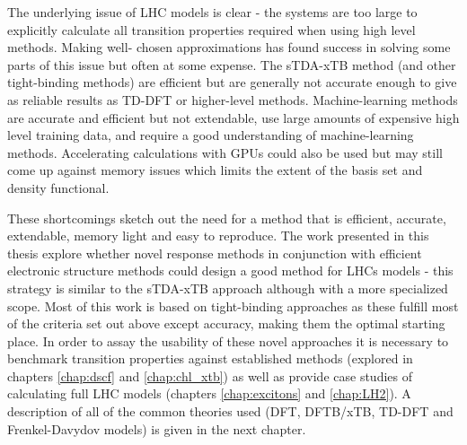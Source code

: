 The underlying issue of LHC models is clear - the systems are too large to explicitly
calculate all transition properties required when using high level methods. Making
well- chosen approximations has found success in solving some parts of this issue
but often at some expense. The sTDA-xTB method (and other tight-binding methods) 
are efficient but are generally not accurate enough to give as reliable results 
as TD-DFT or higher-level methods. Machine-learning methods are accurate and efficient
but not extendable, use large amounts of expensive high level training data, and
require a good understanding of machine-learning methods. Accelerating calculations 
with GPUs could also be used but may still come up against memory issues which limits 
the extent of the basis set and density functional.

These shortcomings sketch out the need for a method that is efficient, accurate,
extendable, memory light and easy to reproduce. The work presented in this thesis
explore whether novel response methods in conjunction with efficient electronic 
structure methods could design a good method for LHCs models - this strategy is 
similar to the sTDA-xTB approach although with a more specialized scope. Most of
this work is based on tight-binding approaches as these fulfill most of the criteria 
set out above except accuracy, making them the optimal starting place. In order 
to assay the usability of these novel approaches it is necessary to benchmark transition 
properties against established methods (explored in chapters \ref{chap:dscf} and 
\ref{chap:chl_xtb}) as well as provide case studies of calculating full LHC models 
(chapters \ref{chap:excitons} and \ref{chap:LH2}). A description of all of the common 
theories used (DFT, DFTB/xTB, TD-DFT and Frenkel-Davydov models) is given in the 
next chapter.